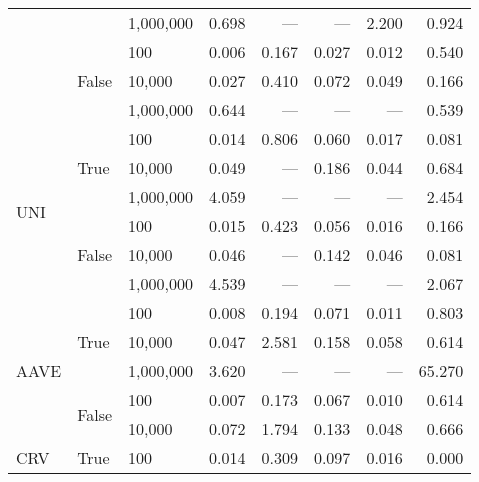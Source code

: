 \begin{tabular}{lllrrrrr}
                          &                        & 1,000,000       & 0.698   & ---    & ---   & 2.200 & 0.924   \\
    \cline{2-8}
                          & \multirow{3}{*}{False} & 100             & 0.006   & 0.167  & 0.027 & 0.012 & 0.540   \\
                          &                        & 10,000          & 0.027   & 0.410  & 0.072 & 0.049 & 0.166   \\
                          &                        & 1,000,000       & 0.644   & ---    & ---   & ---   & 0.539   \\
    \cline{1-8}
    \cline{2-8}
    \multirow{6}{*}{UNI}  & \multirow{3}{*}{True}  & 100             & 0.014   & 0.806  & 0.060 & 0.017 & 0.081   \\
                          &                        & 10,000          & 0.049   & ---    & 0.186 & 0.044 & 0.684   \\
                          &                        & 1,000,000       & 4.059   & ---    & ---   & ---   & 2.454   \\
    \cline{2-8}
                          & \multirow{3}{*}{False} & 100             & 0.015   & 0.423  & 0.056 & 0.016 & 0.166   \\
                          &                        & 10,000          & 0.046   & ---    & 0.142 & 0.046 & 0.081   \\
                          &                        & 1,000,000       & 4.539   & ---    & ---   & ---   & 2.067   \\
    \cline{1-8}
    \cline{2-8}
    \multirow{5}{*}{AAVE} & \multirow{3}{*}{True}  & 100             & 0.008   & 0.194  & 0.071 & 0.011 & 0.803   \\
                          &                        & 10,000          & 0.047   & 2.581  & 0.158 & 0.058 & 0.614   \\
                          &                        & 1,000,000       & 3.620   & ---    & ---   & ---   & 65.270  \\
    \cline{2-8}
                          & \multirow{2}{*}{False} & 100             & 0.007   & 0.173  & 0.067 & 0.010 & 0.614   \\
                          &                        & 10,000          & 0.072   & 1.794  & 0.133 & 0.048 & 0.666   \\
    \cline{1-8}
    \cline{2-8}
    \multirow{5}{*}{CRV}  & \multirow{3}{*}{True}  & 100             & 0.014   & 0.309  & 0.097 & 0.016 & 0.000   \\

\end{tabular}
